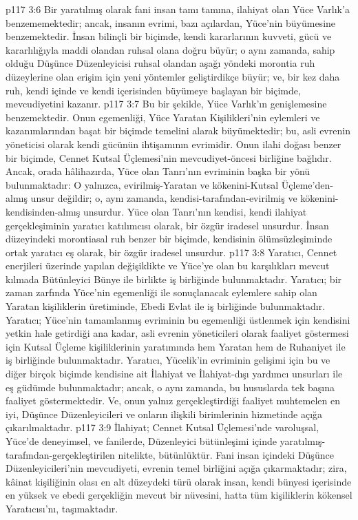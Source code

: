 \vs p117 3:6 Bir yaratılmış olarak fani insan tamı tamına, ilahiyat olan Yüce Varlık’a benzememektedir; ancak, insanın evrimi, bazı açılardan, Yüce’nin büyümesine benzemektedir. İnsan bilinçli bir biçimde, kendi kararlarının kuvveti, gücü ve kararlılığıyla maddi olandan ruhsal olana doğru büyür; o aynı zamanda, sahip olduğu Düşünce Düzenleyicisi ruhsal olandan aşağı yöndeki morontia ruh düzeylerine olan erişim için yeni yöntemler geliştirdikçe büyür; ve, bir kez daha ruh, kendi içinde ve kendi içerisinden büyümeye başlayan bir biçimde, mevcudiyetini kazanır.
\vs p117 3:7 Bu bir şekilde, Yüce Varlık’ın genişlemesine benzemektedir. Onun egemenliği, Yüce Yaratan Kişilikleri’nin eylemleri ve kazanımlarından başat bir biçimde temelini alarak büyümektedir; bu, asli evrenin yöneticisi olarak kendi gücünün ihtişamının evrimidir. Onun ilahi doğası benzer bir biçimde, Cennet Kutsal Üçlemesi’nin mevcudiyet\hyp{}öncesi birliğine bağlıdır. Ancak, orada hâlihazırda, Yüce olan Tanrı’nın evriminin başka bir yönü bulunmaktadır: O yalnızca, evirilmiş\hyp{}Yaratan ve kökenini\hyp{}Kutsal Üçleme’den\hyp{}almış unsur değildir; o, aynı zamanda, kendisi\hyp{}tarafından\hyp{}evirilmiş ve kökenini\hyp{}kendisinden\hyp{}almış unsurdur. Yüce olan Tanrı’nın kendisi, kendi ilahiyat gerçekleşiminin yaratıcı katılımcısı olarak, bir özgür iradesel unsurdur. İnsan düzeyindeki morontiasal ruh benzer bir biçimde, kendisinin ölümsüzleşiminde ortak yaratıcı eş olarak, bir özgür iradesel unsurdur.
\vs p117 3:8 Yaratıcı, Cennet enerjileri üzerinde yapılan değişiklikte ve Yüce’ye olan bu karşılıkları mevcut kılmada Bütünleyici Bünye ile birlikte iş birliğinde bulunmaktadır. Yaratıcı; bir zaman zarfında Yüce’nin egemenliği ile sonuçlanacak eylemlere sahip olan Yaratan kişiliklerin üretiminde, Ebedi Evlat ile iş birliğinde bulunmaktadır. Yaratıcı; Yüce’nin tamamlanmış evriminin bu egemenliği üstlenmek için kendisini yetkin hale getirdiği ana kadar, asli evrenin yöneticileri olarak faaliyet göstermesi için Kutsal Üçleme kişiliklerinin yaratımında hem Yaratan hem de Ruhaniyet ile iş birliğinde bulunmaktadır. Yaratıcı, Yücelik’in evriminin gelişimi için bu ve diğer birçok biçimde kendisine ait İlahiyat ve İlahiyat\hyp{}dışı yardımcı unsurları ile eş güdümde bulunmaktadır; ancak, o aynı zamanda, bu hususlarda tek başına faaliyet göstermektedir. Ve, onun yalnız gerçekleştirdiği faaliyet muhtemelen en iyi, Düşünce Düzenleyicileri ve onların ilişkili birimlerinin hizmetinde açığa çıkarılmaktadır.
\vs p117 3:9 İlahiyat; Cennet Kutsal Üçlemesi’nde varoluşsal, Yüce’de deneyimsel, ve fanilerde, Düzenleyici bütünleşimi içinde yaratılmış\hyp{}tarafından\hyp{}gerçekleştirilen nitelikte, bütünlüktür. Fani insan içindeki Düşünce Düzenleyicileri’nin mevcudiyeti, evrenin temel birliğini açığa çıkarmaktadır; zira, kâinat kişiliğinin olası en alt düzeydeki türü olarak insan, kendi bünyesi içerisinde en yüksek ve ebedi gerçekliğin mevcut bir nüvesini, hatta tüm kişiliklerin kökensel Yaratıcısı’nı, taşımaktadır.
